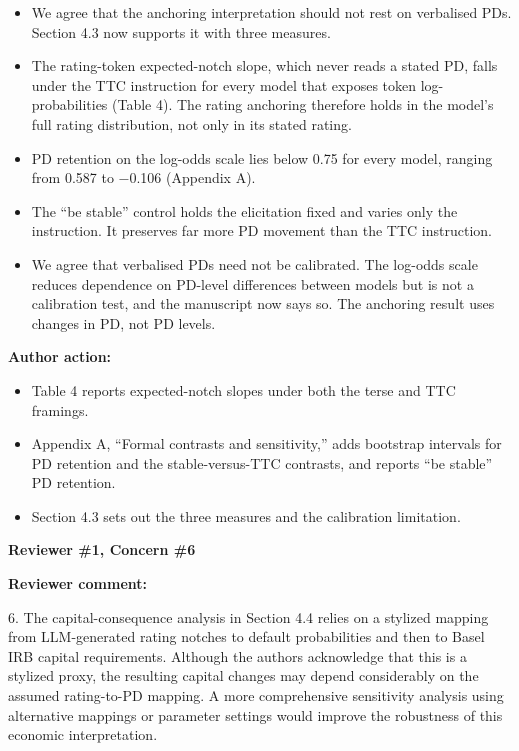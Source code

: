 \documentclass[11pt]{article}
\newcommand{\rvcomment}[1]{{\color{ReviewerGreen}#1}}
\newcommand{\concern}[1]{\textbf{\color{ReviewerGreen}#1}}
\begin{document}
\begin{itemize}

\item We agree that the anchoring interpretation should not rest on verbalised PDs. Section 4.3 now supports it with three measures.

\item The rating-token expected-notch slope, which never reads a stated PD, falls under the TTC instruction for every model that exposes token log-probabilities (Table 4). The rating anchoring therefore holds in the model's full rating distribution, not only in its stated rating.

\item PD retention on the log-odds scale lies below 0.75 for every model, ranging from 0.587 to $-$0.106 (Appendix A).

\item The ``be stable'' control holds the elicitation fixed and varies only the instruction. It preserves far more PD movement than the TTC instruction.

\item We agree that verbalised PDs need not be calibrated. The log-odds scale reduces dependence on PD-level differences between models but is not a calibration test, and the manuscript now says so. The anchoring result uses changes in PD, not PD levels.

\end{itemize}

\textbf{Author action:}

\begin{itemize}

\item Table 4 reports expected-notch slopes under both the terse and TTC framings.

\item Appendix A, ``Formal contrasts and sensitivity,'' adds bootstrap intervals for PD retention and the stable-versus-TTC contrasts, and reports ``be stable'' PD retention.

\item Section 4.3 sets out the three measures and the calibration limitation.

\end{itemize}

\vspace{12pt}
\concern{Reviewer \#1, Concern \#6}

\concern{Reviewer comment:}

\rvcomment{6. The capital-consequence analysis in Section 4.4 relies on a stylized mapping from LLM-generated rating notches to default probabilities and then to Basel IRB capital requirements. Although the authors acknowledge that this is a stylized proxy, the resulting capital changes may depend considerably on the assumed rating-to-PD mapping. A more comprehensive sensitivity analysis using alternative mappings or parameter settings would improve the robustness of this economic interpretation.}
\end{document}
